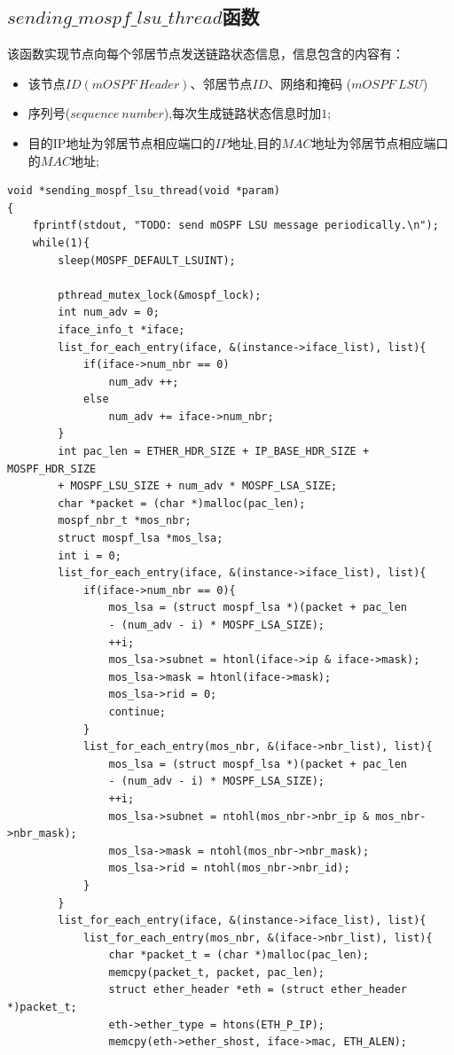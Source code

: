 \documentclass[UTF8,noindent]{ctexart}
\begin{document}
\subsection{$sending\_mospf\_lsu\_thread$函数}
该函数实现节点向每个邻居节点发送链路状态信息，信息包含的内容有：
\begin{itemize}
  \item 该节点$ID (mOSPF\ Header)$、邻居节点$ID$、网络和掩码 ($mOSPF\ LSU$)
	\item 序列号($sequence\ number$),每次生成链路状态信息时加$1$;
	  \item 目的IP地址为邻居节点相应端口的$IP$地址,目的$MAC$地址为邻居节点相应端口
的$MAC$地址;
\end{itemize}
\begin{lstlisting}
void *sending_mospf_lsu_thread(void *param)
{
	fprintf(stdout, "TODO: send mOSPF LSU message periodically.\n");
    while(1){
    	sleep(MOSPF_DEFAULT_LSUINT);

    	pthread_mutex_lock(&mospf_lock);
    	int num_adv = 0;
    	iface_info_t *iface;
    	list_for_each_entry(iface, &(instance->iface_list), list){
    		if(iface->num_nbr == 0)
    			num_adv ++;
    		else
    	        num_adv += iface->num_nbr;
    	}
        int pac_len = ETHER_HDR_SIZE + IP_BASE_HDR_SIZE + MOSPF_HDR_SIZE 
		+ MOSPF_LSU_SIZE + num_adv * MOSPF_LSA_SIZE;
        char *packet = (char *)malloc(pac_len);
        mospf_nbr_t *mos_nbr;
        struct mospf_lsa *mos_lsa;
        int i = 0;
        list_for_each_entry(iface, &(instance->iface_list), list){
        	if(iface->num_nbr == 0){
        		mos_lsa = (struct mospf_lsa *)(packet + pac_len 
				- (num_adv - i) * MOSPF_LSA_SIZE);
        		++i;
        		mos_lsa->subnet = htonl(iface->ip & iface->mask);
        		mos_lsa->mask = htonl(iface->mask);
        		mos_lsa->rid = 0;
        		continue;
        	}
            list_for_each_entry(mos_nbr, &(iface->nbr_list), list){
                mos_lsa = (struct mospf_lsa *)(packet + pac_len 
				- (num_adv - i) * MOSPF_LSA_SIZE);
                ++i;
                mos_lsa->subnet = ntohl(mos_nbr->nbr_ip & mos_nbr->nbr_mask);
                mos_lsa->mask = ntohl(mos_nbr->nbr_mask);
                mos_lsa->rid = ntohl(mos_nbr->nbr_id);
            }
        }
        list_for_each_entry(iface, &(instance->iface_list), list){
            list_for_each_entry(mos_nbr, &(iface->nbr_list), list){
            	char *packet_t = (char *)malloc(pac_len);
            	memcpy(packet_t, packet, pac_len);
            	struct ether_header *eth = (struct ether_header *)packet_t;
                eth->ether_type = htons(ETH_P_IP);       
                memcpy(eth->ether_shost, iface->mac, ETH_ALEN);     


\end{lstlisting}
\end{document}
